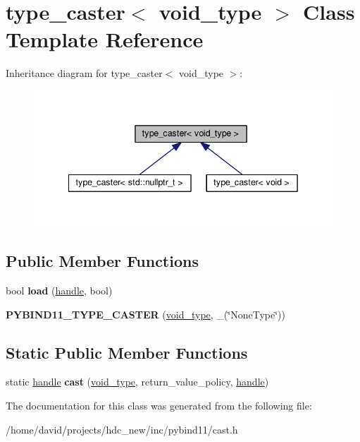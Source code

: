 \hypertarget{classtype__caster_3_01void__type_01_4}{}\section{type\+\_\+caster$<$ void\+\_\+type $>$ Class Template Reference}
\label{classtype__caster_3_01void__type_01_4}


Inheritance diagram for type\+\_\+caster$<$ void\+\_\+type $>$\+:
\nopagebreak
\begin{figure}[H]
\begin{center}
\leavevmode
\includegraphics[width=342pt]{classtype__caster_3_01void__type_01_4__inherit__graph}
\end{center}
\end{figure}
\subsection*{Public Member Functions}
\begin{DoxyCompactItemize}
\item 
bool {\bfseries load} (\hyperlink{classhandle}{handle}, bool)\hypertarget{classtype__caster_3_01void__type_01_4_af218bf85d4811dd9c274ded97ba656ab}{}\label{classtype__caster_3_01void__type_01_4_af218bf85d4811dd9c274ded97ba656ab}

\item 
{\bfseries P\+Y\+B\+I\+N\+D11\+\_\+\+T\+Y\+P\+E\+\_\+\+C\+A\+S\+T\+ER} (\hyperlink{structvoid__type}{void\+\_\+type}, \+\_\+(\char`\"{}None\+Type\char`\"{}))\hypertarget{classtype__caster_3_01void__type_01_4_a178f1e7ef7a6bf020bf5a7ae91748212}{}\label{classtype__caster_3_01void__type_01_4_a178f1e7ef7a6bf020bf5a7ae91748212}

\end{DoxyCompactItemize}
\subsection*{Static Public Member Functions}
\begin{DoxyCompactItemize}
\item 
static \hyperlink{classhandle}{handle} {\bfseries cast} (\hyperlink{structvoid__type}{void\+\_\+type}, return\+\_\+value\+\_\+policy, \hyperlink{classhandle}{handle})\hypertarget{classtype__caster_3_01void__type_01_4_ae4b1e55c11a9b2ef146189adf6195245}{}\label{classtype__caster_3_01void__type_01_4_ae4b1e55c11a9b2ef146189adf6195245}

\end{DoxyCompactItemize}


The documentation for this class was generated from the following file\+:\begin{DoxyCompactItemize}
\item 
/home/david/projects/hdc\+\_\+new/inc/pybind11/cast.\+h\end{DoxyCompactItemize}
